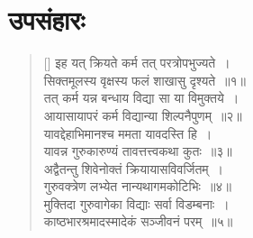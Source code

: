 \documentclass[twoside,12pt,notitlepage]{book}
\begin{document}
\section{उपसंहारः}
\begin{verse}[\versewidth]
इह यत् क्रियते कर्म तत् परत्रोपभुज्यते~।\\[-6pt]
सिक्तमूलस्य वृक्षस्य फलं शाखासु दृश्यते~॥१॥\\
तत् कर्म यन्न बन्धाय विद्या सा या विमुक्तये~।\\[-6pt]
आयासायापरं कर्म विद्यान्या शिल्पनैपुणम्~॥२॥\\
यावद्देहाभिमानश्च ममता यावदस्ति हि~।\\[-6pt]
यावन्न गुरुकारुण्यं तावत्तत्त्वकथा कुतः~॥३॥\\
अद्वैतन्तु शिवेनोक्तं क्रियायासविवर्जितम्~।\\[-6pt]
गुरुवक्त्रेण लभ्येत नान्यथागमकोटिभिः~॥४॥\\
मुक्तिदा गुरुवागेका विद्याः सर्वा विडम्बनाः~।\\[-6pt]
काष्ठभारश्रमादस्मादेकं सञ्जीवनं परम्~॥५॥\\
\end{verse}
\end{document}
